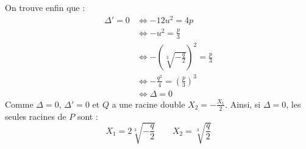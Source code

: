 \documentclass[]{../templates/homework}
\begin{document}
	On trouve enfin que :
	\begin{align*}
		\Delta' = 0 &\iff -12u^2 = 4p \\
		&\iff -u^2 = \frac p 3\\
		&\iff -(\sqrt[3]{-\frac q 2})^2 = \frac p3\\
		&\iff -\frac {q^2} 4 = (\frac p 3)^3\\
		&\iff \Delta = 0
	\end{align*}
	Comme $\Delta = 0$, $\Delta' = 0$ et $Q$ a une racine double $X_2 = -\frac {X_1} 2$.
	Ainsi, si $\Delta = 0$, les seules racines de $P$ sont :
	\begin{equation*}
		X_1 = 2\sqrt[3]{-\frac q 2} \qquad X_2 = \sqrt[3]{\frac q 2}
	\end{equation*}
\end{document}
